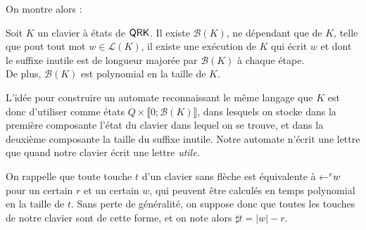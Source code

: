 \documentclass[12pt, a4paper]{article}
\renewcommand{\L}{\mathcal{L}}
\begin{document}
    On montre alors :
    \begin{inutilesbornés}\label{bk}
        Soit $K$ un clavier à états de $\mathsf{QRK}$. Il existe $\mathcal{B}(K)$, ne dépendant que de $K$, telle que pout tout mot $w \in \L(K)$,
        il existe une exécution de $K$ qui écrit $w$ et dont le suffixe inutile est de longueur majorée par $\mathcal{B}(K)$ à chaque étape. \\
        De plus, $\mathcal{B}(K)$ est polynomial en la taille de $K$.
    \end{inutilesbornés}
    L'idée pour construire un automate reconnaissant le même langage que $K$ est donc d'utiliser comme états $Q \times \llbracket 0 ; \mathcal{B}(K) \rrbracket$, dans lesquels on stocke dans la première composante l'état du clavier dans lequel on se trouve,
    et dans la deuxième composante la taille du suffixe inutile. Notre automate n'écrit une lettre que quand notre clavier écrit une lettre \emph{utile}.
    
    On rappelle que toute touche $t$ d'un clavier sans flèche est équivalente à $\mathord{\leftarrow}^r w$ pour un certain $r$ et un certain $w$, qui peuvent être calculés en temps polynomial en la taille de $t$. Sans perte de généralité, on suppose donc que toutes les touches de notre clavier sont de cette forme, et on note alors $\sharp t = |w| - r$.
\end{document}

